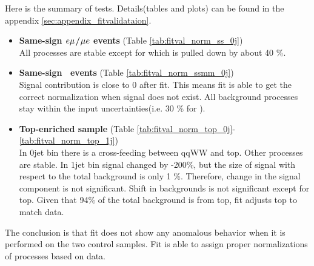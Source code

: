 Here is the summary of tests. Details(tables and plots) can be found in the appendix \ref{sec:appendix_fitvalidataion}. 
\begin{itemize}
    \item{\textbf{Same-sign $e\mu$/$\mu e$ events} (Table \ref{tab:fitval_norm_ss_0j}) \\ }  
        All processes are stable except for \Wgstar which is pulled down by about 40 \%.  
    \item{\textbf{Same-sign \M\M~events} (Table \ref{tab:fitval_norm_ssmm_0j}) \\ }  
        Signal contribution is close to 0 after fit. This means fit is able to 
        get the correct normalization when signal does not exist. All background 
        processes stay within the input uncertainties(i.e. 30 \% for  \Wgstar ).   
    \item{\textbf{Top-enriched sample} (Table \ref{tab:fitval_norm_top_0j}-\ref{tab:fitval_norm_top_1j}) \\ }  
        In 0jet bin there is a cross-feeding between qqWW and top. Other processes are stable. 
        In 1jet bin signal changed by -200\%, but the size of signal with respect to the total background 
        is only 1 \%. Therefore, change in the signal component is not significant. 
        Shift in backgrounds is not significant except for top. 
        Given that 94\% of the total background is from top, fit adjusts top to match data.  
\end{itemize} 

The conclusion is that fit does not show any anomalous behavior
when it is performed on the two control samples. Fit is able to assign 
proper normalizations of processes based on data.   

